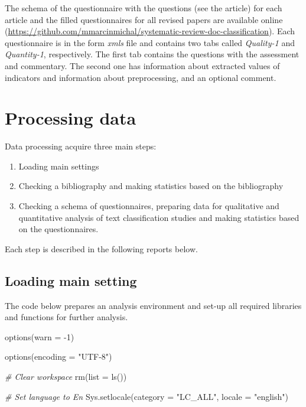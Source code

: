 \documentclass[
]{article}
\newenvironment{Shaded}{\begin{snugshade}}{\end{snugshade}}
\newcommand{\AttributeTok}[1]{\textcolor[rgb]{0.77,0.63,0.00}{#1}}
\newcommand{\CommentTok}[1]{\textcolor[rgb]{0.56,0.35,0.01}{\textit{#1}}}
\newcommand{\DecValTok}[1]{\textcolor[rgb]{0.00,0.00,0.81}{#1}}
\newcommand{\FunctionTok}[1]{\textcolor[rgb]{0.00,0.00,0.00}{#1}}
\newcommand{\NormalTok}[1]{#1}
\newcommand{\SpecialCharTok}[1]{\textcolor[rgb]{0.00,0.00,0.00}{#1}}
\newcommand{\StringTok}[1]{\textcolor[rgb]{0.31,0.60,0.02}{#1}}
\providecommand{\tightlist}{%
  \setlength{\itemsep}{0pt}\setlength{\parskip}{0pt}}
\begin{document}
The schema of the questionnaire with the questions (see the article) for each article and the filled questionnaires for all revised papers are available online (\url{https://github.com/mmarcinmichal/systematic-review-doc-classification}). Each questionnaire is in the form \emph{xmls} file and contains two tabs called \emph{Quality-1} and \emph{Quantity-1}, respectively. The first tab contains the questions with the assessment and commentary. The second one has information about extracted values of indicators and information about preprocessing, and an optional comment.

\hypertarget{processing-data}{%
\section{Processing data}\label{processing-data}}

Data processing acquire three main steps:

\begin{enumerate}
\def\labelenumi{\arabic{enumi}.}
\tightlist
\item
  Loading main settings
\item
  Checking a bibliography and making statistics based on the bibliography
\item
  Checking a schema of questionnaires, preparing data for qualitative and quantitative analysis of text classification studies and making statistics based on the questionnaires.
\end{enumerate}

Each step is described in the following reports below.

\hypertarget{loading-main-setting}{%
\subsection{Loading main setting}\label{loading-main-setting}}

The code below prepares an analysis environment and set-up all required libraries and functions for further analysis.

\begin{Shaded}
\begin{Highlighting}[]
\FunctionTok{options}\NormalTok{(}\AttributeTok{warn =} \SpecialCharTok{{-}}\DecValTok{1}\NormalTok{) }

\FunctionTok{options}\NormalTok{(}\AttributeTok{encoding =} \StringTok{"UTF{-}8"}\NormalTok{)}

\CommentTok{\# Clear workspace}
\FunctionTok{rm}\NormalTok{(}\AttributeTok{list =} \FunctionTok{ls}\NormalTok{())}

\CommentTok{\# Set language to En}
\FunctionTok{Sys.setlocale}\NormalTok{(}\AttributeTok{category =} \StringTok{"LC\_ALL"}\NormalTok{, }\AttributeTok{locale =} \StringTok{"english"}\NormalTok{)}
\end{Highlighting}
\end{Shaded}
\end{document}
